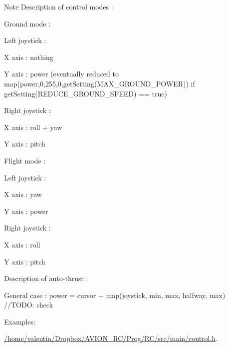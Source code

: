 \begin{DoxyNote}{Note}
Description of control modes \+:
\begin{DoxyItemize}
\item Ground mode \+:
\begin{DoxyItemize}
\item Left joystick \+:
\begin{DoxyItemize}
\item X axis \+: nothing
\item Y axis \+: power (eventually reduced to map(power,0,255,0,get\+Setting(\+M\+A\+X\+\_\+\+G\+R\+O\+U\+N\+D\+\_\+\+P\+O\+W\+E\+R)) if get\+Setting(\+R\+E\+D\+U\+C\+E\+\_\+\+G\+R\+O\+U\+N\+D\+\_\+\+S\+P\+E\+E\+D) == true)
\end{DoxyItemize}
\item Right joystick \+:
\begin{DoxyItemize}
\item X axis \+: roll + yaw
\item Y axis \+: pitch
\end{DoxyItemize}
\end{DoxyItemize}
\item Flight mode \+:
\begin{DoxyItemize}
\item Left joystick \+:
\begin{DoxyItemize}
\item X axis \+: yaw
\item Y axis \+: power
\end{DoxyItemize}
\item Right joystick \+:
\begin{DoxyItemize}
\item X axis \+: roll
\item Y axis \+: pitch 
\end{DoxyItemize}
\end{DoxyItemize}
\end{DoxyItemize}

Description of auto-\/thrust \+:
\begin{DoxyItemize}
\item General case \+: power = cursor + map(joystick, min, max, halfway, max) //\+T\+O\+DO\+: check 
\end{DoxyItemize}
\end{DoxyNote}
\begin{Desc}
\item[Examples\+: ]\par
\hyperlink{_2home_2valentin_2_dropbox_2_a_v_i_o_n__r_c_2_prog_2_r_c_2src_2main_2control_8h-example}{/home/valentin/\+Dropbox/\+A\+V\+I\+O\+N\+\_\+\+R\+C/\+Prog/\+R\+C/src/main/control.\+h}.\end{Desc}


